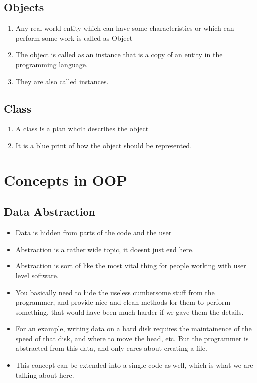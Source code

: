 \documentclass[11pt]{article}
\begin{document}
\subsection{Objects}

\begin{enumerate}
    \item Any real world entity which can have some characteristics or which can perform some work is called as Object
    \item The object is called as an instance that is a copy of an entity in the programming language. 
    \item They are also called instances. 
\end{enumerate}

\subsection{Class}
\begin{enumerate}
    \item A class is a plan whcih describes the object
    \item It is a blue print of how the object should be represented.
\end{enumerate}

\section{Concepts in OOP}
\subsection{Data Abstraction}
\begin{itemize}
	\item Data is hidden from parts of the code and the user
	\item Abstraction is a rather wide topic, it doesnt just end here. 
	\item Abstraction is sort of like the most vital thing for people working with user level software. 
	\item You basically need to hide the useless cumbersome stuff from the programmer, and provide nice and clean methods for them to perform something, that would have been much harder if we gave them the details. 
	\item For an example, writing data on a hard disk requires the maintainence of the speed of that disk, and where to move the head, etc. But the programmer is abstracted from this data, and only cares about creating a file. 
	\item This concept can be extended into a single code as well, which is what we are talking about here.
\end{itemize}
\end{document}
